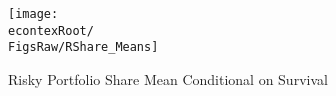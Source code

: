\begin{figure}[]
	\centerline{\texttt{[image: \\econtexRoot/\\FigsRaw/RShare\_Means]}}
	\caption{Risky Portfolio Share Mean Conditional on Survival}
	\label{fig:RShareMean}
\end{figure}
